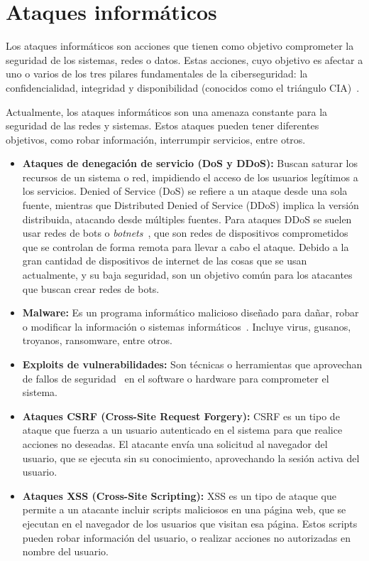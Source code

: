 \section{Ataques informáticos}
Los ataques informáticos son acciones que tienen como objetivo comprometer la seguridad de los sistemas, redes o datos.
Estas acciones, cuyo objetivo es afectar a uno o varios de los tres pilares fundamentales de la ciberseguridad: la confidencialidad, integridad y disponibilidad (conocidos como el triángulo CIA)~\cite{Chaeikar2012, NicholasEdwards2020}.

Actualmente, los ataques informáticos son una amenaza constante para la seguridad de las redes y sistemas. Estos ataques pueden tener diferentes objetivos, como robar información, interrumpir servicios, entre otros.

\begin{itemize}
    \item \textbf{Ataques de denegación de servicio (DoS y DDoS):} Buscan saturar los recursos de un sistema o red, impidiendo el acceso de los usuarios legítimos a los servicios. Denied of Service (DoS) se refiere a un ataque desde una sola fuente, mientras que Distributed Denied of Service (DDoS) implica la versión distribuida, atacando desde múltiples fuentes. Para ataques DDoS se suelen usar redes de bots o \textit{botnets}~\cite{kolias2017}, que son redes de dispositivos comprometidos que se controlan de forma remota para llevar a cabo el ataque. Debido a la gran cantidad de dispositivos de internet de las cosas que se usan actualmente, y su baja seguridad, son un objetivo común para los atacantes que buscan crear redes de bots. 

    \item \textbf{Malware:} Es un programa informático malicioso diseñado para dañar, robar o modificar la información o sistemas informáticos~\cite{SushilJajodia2025}. Incluye virus, gusanos, troyanos, ransomware, entre otros. 

    \item \textbf{Exploits de vulnerabilidades:} Son técnicas o herramientas que aprovechan de fallos de seguridad~\cite{SushilJajodia2025} en el software o hardware para comprometer el sistema. 

	\item \textbf{Ataques CSRF (Cross-Site Request Forgery):} CSRF es un tipo de ataque que fuerza a un usuario autenticado en el sistema para que realice acciones no deseadas. El atacante envía una solicitud al navegador del usuario, que se ejecuta sin su conocimiento, aprovechando la sesión activa del usuario.

	\item \textbf{Ataques XSS (Cross-Site Scripting):} XSS es un tipo de ataque que permite a un atacante incluir scripts maliciosos en una página web, que se ejecutan en el navegador de los usuarios que visitan esa página. Estos scripts pueden robar información del usuario, o realizar acciones no autorizadas en nombre del usuario.
\end{itemize}


